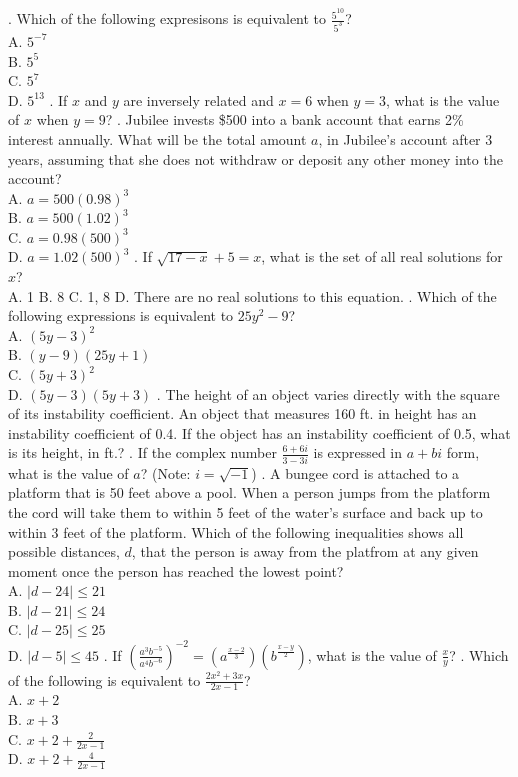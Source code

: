 \documentclass[../satmath.tex]{subfiles}
\begin{document}
. Which of the following expresisons is equivalent to $\frac{5^{10}}{5^3}$?\\
A. $5^{-7}$\\
B. $5^5$\\
C. $5^7$\\
D. $5^{13}$
. If $x$ and $y$ are inversely related and $x=6$ when $y=3$, what is the value of $x$ when $y=9$?
. Jubilee invests \$500 into a bank account that earns 2\% interest annually. What will be the total amount $a$, in Jubilee's account after 3 years, 
assuming that she does not withdraw or deposit any other money into the account?\\
A. $a=500(0.98)^3$\\
B. $a=500(1.02)^3$\\
C. $a=0.98(500)^3$\\
D. $a=1.02(500)^3$
. If $\sqrt{17-x}+5=x$, what is the set of all real solutions for $x$?\\
A. {1} \quad B. {8} \quad C. {1, 8} \quad D. There are no real solutions to this equation.
. Which of the following expressions is equivalent to $25y^2-9$?\\
A. $(5y-3)^2$\\
B. $(y-9)(25y+1)$\\
C. $(5y+3)^2$\\
D. $(5y-3)(5y+3)$
. The height of an object varies directly with the square of its instability coefficient. An object that measures 160 ft. in height has an 
instability coefficient of 0.4. If the object has an instability coefficient of 0.5, what is its height, in ft.?
. If the complex number $\frac{6+6i}{3-3i}$ is expressed in $a+bi$ form, what is the value of $a$? (Note: $i=\sqrt{-1}$)
. A bungee cord is attached to a platform that is 50 feet above a pool. When a person jumps from the platform the cord will take them to within 
5 feet of the water's surface and back up to within 3 feet of the platform. Which of the following inequalities shows all possible distances, $d$, 
that the person is away from the platfrom at any given moment once the person has reached the lowest point?\\
A. $|d-24|\leq 21$\\
B. $|d-21|\leq 24$\\
C. $|d-25|\leq 25$\\
D. $|d-5|\leq 45$
. If $\left(\frac{a^3b^{-5}}{a^4b^{-6}}\right)^{-2}=\left(a^{\frac{x-2}{3}}\right)\left(b^{\frac{x-y}{2}}\right)$, what is the value of $\frac{x}{y}$?
. Which of the following is equivalent to $\frac{2x^2+3x}{2x-1}$?\\
A. $x+2$\\
B. $x+3$\\
C. $x+2+\frac{2}{2x-1}$\\
D. $x+2+\frac{4}{2x-1}$
\end{document}
